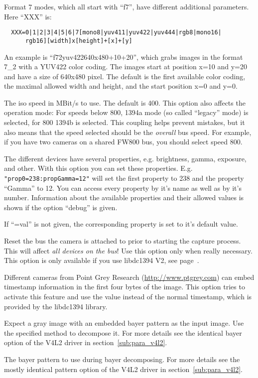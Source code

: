 \begin{description}
  Format 7 modes, which all start with ``f7'', have different
  additional parameters. Here ``XXX'' is:
\begin{verbatim}
  XXX=0|1|2|3|4|5|6|7[mono8|yuv411|yuv422|yuv444|rgb8|mono16|
      rgb16][width]x[height]+[x]+[y]
\end{verbatim}
  An example is ``f72yuv422640x480+10+20'', which grabs images in
  the format 7\_2 with a YUV422 color coding. The images start at
  position x=10 and y=20 and have a size of 640x480 pixel. The
  default is the first available color coding, the maximal allowed
  width and height, and the start position x=0 and y=0.
\item[speed=100\textbar{}200\textbar{}400\textbar{}800]
  The iso speed in MBit/s to use. The default is 400. This option
  also affects the operation mode: For speeds below 800, 1394a mode
  (so called ``legacy'' mode) is selected, for 800 1394b is
  selected. This coupling helps prevent mistakes, but it also means
  that the speed selected should be the \emph{overall} bus
  speed. For example, if you have two cameras on a shared FW800 bus,
  you should select speed 800.
\item[propX=val] The different devices have several properties,
  e.g. brightness, gamma, exposure, and other. With this option you
  can set these properties. E.g. \verb|"prop0=238:propGamma=12"|
  will set the first property to 238 and the property ``Gamma'' to
  12. You can access every property by it's name as well as by it's
  number. Information about the available properties and their
  allowed values is shown if the option ``debug'' is given.

  If ``=val'' is not given, the corresponding property is set to
  it's default value.
\item[reset] Reset the bus the camera is attached to prior to
  starting the capture process. This will affect \emph{all devices
  on the bus}! Use this option only when really necessary. This
  option is only available if you use libdc1394 V2, see
  page~.
\item[pgtimestamp] Different cameras from Point Grey Research
  (\url{http://www.ptgrey.com}) can embed timestamp information in
  the first four bytes of the image. This option tries to activate
  this feature and use the value instead of the normal timestamp,
  which is provided by the libdc1394 library.
\item[bayer=down\textbar{}neighbor\textbar{}bilinear\textbar{}hue\textbar{}edge\textbar{}ahd]
  Expect a gray image with an embedded bayer pattern as the input
  image. Use the specified method to decompose it. For more details
  see the identical bayer option of the V4L2 driver in
  section~\ref{sub:para_v4l2}.
\item[pattern=RGGB\textbar{}BGGR\textbar{}GRBG\textbar{}GBRG]
  The bayer pattern to use during bayer decomposing. For more
  details see the mostly identical pattern option of the V4L2 driver
  in section~\ref{sub:para_v4l2}.


\end{description}
